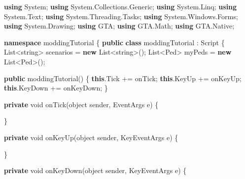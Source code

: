 \documentclass[
  openany]{book}
\newenvironment{Shaded}{\begin{snugshade}}{\end{snugshade}}
\newcommand{\DataTypeTok}[1]{\textcolor[rgb]{0.13,0.29,0.53}{#1}}
\newcommand{\FunctionTok}[1]{\textcolor[rgb]{0.00,0.00,0.00}{#1}}
\newcommand{\KeywordTok}[1]{\textcolor[rgb]{0.13,0.29,0.53}{\textbf{#1}}}
\newcommand{\NormalTok}[1]{#1}
\begin{document}
\begin{Shaded}
\begin{Highlighting}[]
\KeywordTok{using}\NormalTok{ System;}
\KeywordTok{using}\NormalTok{ System.}\FunctionTok{Collections}\NormalTok{.}\FunctionTok{Generic}\NormalTok{;}
\KeywordTok{using}\NormalTok{ System.}\FunctionTok{Linq}\NormalTok{;}
\KeywordTok{using}\NormalTok{ System.}\FunctionTok{Text}\NormalTok{;}
\KeywordTok{using}\NormalTok{ System.}\FunctionTok{Threading}\NormalTok{.}\FunctionTok{Tasks}\NormalTok{;}
\KeywordTok{using}\NormalTok{ System.}\FunctionTok{Windows}\NormalTok{.}\FunctionTok{Forms}\NormalTok{;}
\KeywordTok{using}\NormalTok{ System.}\FunctionTok{Drawing}\NormalTok{;}
\KeywordTok{using}\NormalTok{ GTA;}
\KeywordTok{using}\NormalTok{ GTA.}\FunctionTok{Math}\NormalTok{;}
\KeywordTok{using}\NormalTok{ GTA.}\FunctionTok{Native}\NormalTok{;}

\KeywordTok{namespace}\NormalTok{ moddingTutorial}
\NormalTok{\{}
    \KeywordTok{public} \KeywordTok{class}\NormalTok{ moddingTutorial : Script}
\NormalTok{    \{}
\NormalTok{        List<}\DataTypeTok{string}\NormalTok{> scenarios = }\KeywordTok{new}\NormalTok{ List<}\DataTypeTok{string}\NormalTok{>();}
\NormalTok{        List<Ped> myPeds = }\KeywordTok{new}\NormalTok{ List<Ped>();}

        \KeywordTok{public} \FunctionTok{moddingTutorial}\NormalTok{()}
\NormalTok{        \{}
            \KeywordTok{this}\NormalTok{.}\FunctionTok{Tick}\NormalTok{ += onTick;}
            \KeywordTok{this}\NormalTok{.}\FunctionTok{KeyUp}\NormalTok{ += onKeyUp;}
            \KeywordTok{this}\NormalTok{.}\FunctionTok{KeyDown}\NormalTok{ += onKeyDown;}
\NormalTok{        \}}

        \KeywordTok{private} \DataTypeTok{void} \FunctionTok{onTick}\NormalTok{(}\DataTypeTok{object}\NormalTok{ sender, EventArgs e)}
\NormalTok{        \{}
           
\NormalTok{        \}}

        \KeywordTok{private} \DataTypeTok{void} \FunctionTok{onKeyUp}\NormalTok{(}\DataTypeTok{object}\NormalTok{ sender, KeyEventArgs e)}
\NormalTok{        \{}

\NormalTok{        \}}

        \KeywordTok{private} \DataTypeTok{void} \FunctionTok{onKeyDown}\NormalTok{(}\DataTypeTok{object}\NormalTok{ sender, KeyEventArgs e)}
\NormalTok{        \{}
            

\end{Highlighting}
\end{Shaded}
\end{document}
